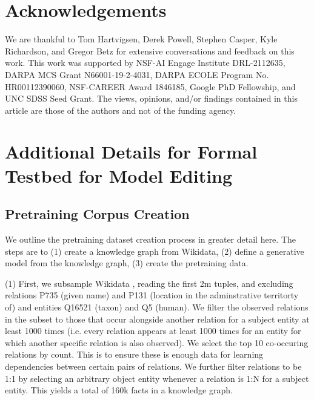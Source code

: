 \documentclass[11pt,a4paper]{article}
\begin{document}
\section*{Acknowledgements}
\vspace{-1pt}

We are thankful to Tom Hartvigsen, Derek Powell, Stephen Casper, Kyle Richardson, and Gregor Betz for extensive conversations and feedback on this work. This work was supported by NSF-AI Engage Institute DRL-2112635, DARPA MCS Grant N66001-19-2-4031, DARPA ECOLE Program No. HR00112390060, NSF-CAREER Award 1846185, Google PhD Fellowship, and UNC SDSS Seed Grant. The views, opinions, and/or findings contained in this article are those of the authors and not of the funding agency.




\appendix

\section{Additional Details for Formal Testbed for Model Editing}
\label{app:formal_testbed}

\subsection{Pretraining Corpus Creation}

We outline the pretraining dataset creation process in greater detail here. The steps are to (1) create a knowledge graph from Wikidata, (2) define a generative model from the knowledge graph, (3) create the pretraining data.

(1) First, we subsample Wikidata \citep{vrandevcic2014wikidata, wang2021kepler}, reading the first 2m tuples, and excluding relations P735 (given name) and P131 (location in the adminstrative territorty of) and entities Q16521 (taxon) and Q5 (human). We filter the observed relations in the subset to those that occur alongside another relation for a subject entity at least 1000 times (i.e. every relation appears at least 1000 times for an entity for which another specific relation is also observed). We select the top 10 co-occuring relations by count. This is to ensure these is enough data for learning dependencies between certain pairs of relations. We further filter relations to be 1:1 by selecting an arbitrary object entity whenever a relation is 1:N for a subject entity. This yields a total of 160k facts in a knowledge graph.
\end{document}
